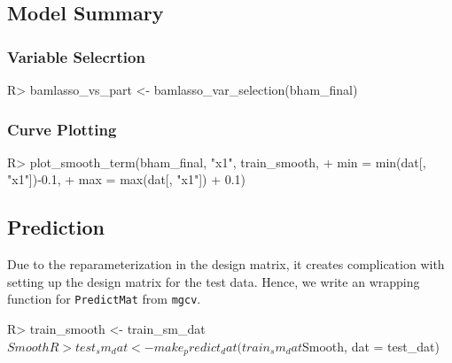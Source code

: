 \documentclass[
]{jss}
\begin{document}
\begin{CodeChunk}
\end{CodeChunk}

\subsection{Model Summary}
\subsubsection{Variable Selecrtion}

\begin{CodeChunk}
\begin{CodeInput}
R> bamlasso_vs_part <- bamlasso_var_selection(bham_final)
\end{CodeInput}
\end{CodeChunk}

\subsubsection{Curve Plotting}

\begin{CodeChunk}
\begin{CodeInput}
R> plot_smooth_term(bham_final, "x1", train_smooth,
+                      min = min(dat[, "x1"])-0.1,
+                      max = max(dat[, "x1"]) + 0.1)
\end{CodeInput}
\end{CodeChunk}

\subsection{Prediction}

Due to the reparameterization in the design matrix, it creates
complication with setting up the design matrix for the test data. Hence,
we write an wrapping function for \texttt{PredictMat} from
\texttt{mgcv}.

\begin{CodeChunk}
\begin{CodeInput}
R> train_smooth <- train_sm_dat$Smooth
R> test_sm_dat <- make_predict_dat(train_sm_dat$Smooth, dat = test_dat)
\end{CodeInput}
\end{CodeChunk}
\end{document}
